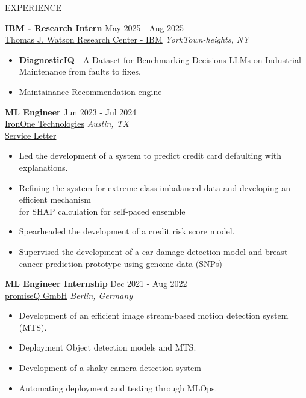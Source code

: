 \documentclass{resume} %
\begin{document}
\begin{rSection}{EXPERIENCE}

\textbf{IBM - Research Intern} \hfill May 2025 - Aug 2025\\
\href{https://research.ibm.com/labs/yorktown-heights}{Thomas J. Watson Research Center - IBM} \hfill \textit{YorkTown-heights, NY}
 \begin{itemize}
    \itemsep -3pt {} 
     \item \textbf{DiagnosticIQ} - A Dataset for Benchmarking Decisions LLMs on Industrial Maintenance from faults to fixes.
     \item Maintainance Recommendation engine
 \end{itemize}

\textbf{ML Engineer} \hfill Jun 2023 - Jul 2024\\
\href{https://irononeailabs.com}{IronOne Technologies} \hfill \textit{Austin, TX} \\
\href{https://drive.google.com/file/d/18g-9RbiW1LLCa3f9J8CWWccwRikGCOnR/view?usp=sharing}{Service Letter}
 \begin{itemize}
    \itemsep -3pt {} 
     \item Led the development of a system to predict credit card defaulting with explanations.
     \item Refining the system for extreme class imbalanced data and developing an efficient mechanism \\ for SHAP calculation for self-paced ensemble
    \item Spearheaded the development of a credit risk score model.
    \item Supervised the development of a car damage detection model and breast cancer prediction prototype using genome data (SNPs)
 \end{itemize}
 
\textbf{ML Engineer Internship} \hfill Dec 2021 - Aug 2022\\
\href{https://www.promiseq.com}{promiseQ GmbH} \hfill \textit{Berlin, Germany}
 \begin{itemize}
    \itemsep -3pt {} 
     \item Development of an efficient image stream-based motion detection system (MTS).
     \item Deployment Object detection models and MTS.
     \item Development of a shaky camera detection system
     \item Automating deployment and testing through MLOps.
 \end{itemize}

\end{rSection} 
\end{document}
